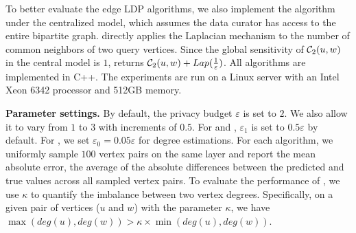 {To better evaluate the edge LDP algorithms, we also implement the \cdp algorithm under the centralized model, which assumes the data curator has access to the entire bipartite graph. \cdp directly applies the Laplacian mechanism to the number of common neighbors of two query vertices. Since the global sensitivity of $\mathcal{C}_2(u,w)$ in the central model is $1$, \cdp returns $\mathcal{C}_2(u,w) + Lap(\frac{1}{\varepsilon})$. }
All algorithms are implemented in C++. The experiments are run on a Linux server with an Intel Xeon 6342 processor and 512GB memory.

\noindent
{\bf Parameter settings.} 
By default, the privacy budget $\varepsilon$ is set to $2$. We also allow it to vary from $1$ to $3$ with increments of $0.5$. 
For \advss and \advdsbasic, $\varepsilon_1$ is set to $0.5 \varepsilon$ by default. 
For \advds, we set $\varepsilon_0 = 0.05 \varepsilon$ for degree estimations. 
For each algorithm, we uniformly sample $100$ vertex pairs on the same layer and report the mean absolute error, the average of the absolute differences between the predicted and true values across all sampled vertex pairs. 
To evaluate the performance of \advds, we use $\kappa$ to quantify the imbalance between two vertex degrees. 
Specifically, on a given pair of vertices ($u$ and $w$) with the parameter $\kappa$,
we have $\max(deg(u), deg(w)) > \kappa \times \min(deg(u), deg(w))$. 



